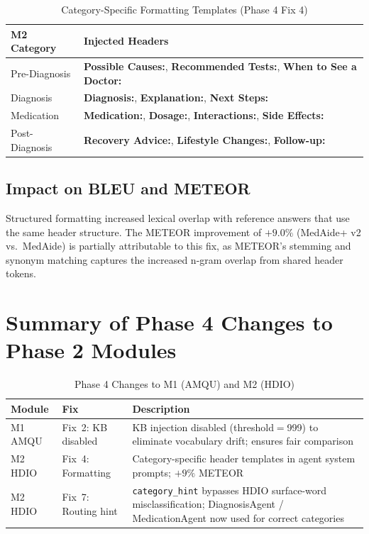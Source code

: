 \documentclass[a4paper,12pt]{article}
\begin{document}
\begin{table}[h]
\centering
\caption{Category-Specific Formatting Templates (Phase 4 Fix 4)}
\label{tab:format_templates}
\begin{tabular}{ll}
\toprule
\textbf{M2 Category} & \textbf{Injected Headers} \\
\midrule
Pre-Diagnosis  & \textbf{Possible Causes:}, \textbf{Recommended Tests:},
                  \textbf{When to See a Doctor:} \\
Diagnosis      & \textbf{Diagnosis:}, \textbf{Explanation:},
                  \textbf{Next Steps:} \\
Medication     & \textbf{Medication:}, \textbf{Dosage:},
                  \textbf{Interactions:}, \textbf{Side Effects:} \\
Post-Diagnosis & \textbf{Recovery Advice:}, \textbf{Lifestyle Changes:},
                  \textbf{Follow-up:} \\
\bottomrule
\end{tabular}
\end{table}

\subsection{Impact on BLEU and METEOR}

Structured formatting increased lexical overlap with reference answers
that use the same header structure. The METEOR improvement of $+9.0\%$
(MedAide+ v2 vs.\ MedAide) is partially attributable to this fix, as
METEOR's stemming and synonym matching captures the increased n-gram
overlap from shared header tokens.

\section{Summary of Phase 4 Changes to Phase 2 Modules}

\begin{table}[h]
\centering
\caption{Phase 4 Changes to M1 (AMQU) and M2 (HDIO)}
\begin{tabular}{p{1.5cm}p{2.8cm}p{4.2cm}}
\toprule
\textbf{Module} & \textbf{Fix} & \textbf{Description} \\
\midrule
M1 AMQU & Fix~2: KB disabled & KB injection disabled (threshold$=$999)
           to eliminate vocabulary drift; ensures fair comparison \\
M2 HDIO & Fix~4: Formatting & Category-specific header templates in
           agent system prompts; $+9\%$ METEOR \\
M2 HDIO & Fix~7: Routing hint & \texttt{category\_hint} bypasses HDIO
           surface-word misclassification; DiagnosisAgent / MedicationAgent
           now used for correct categories \\
\bottomrule
\end{tabular}
\end{table}
\end{document}
